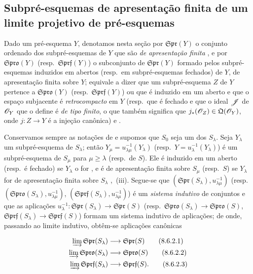 \subsection{Subpré-esquemas de apresentação finita de um limite projetivo de pré-esquemas}
\label{subsection:IV.8.6}

\begin{env}[8.6.1]
\label{IV.8.6.1}
Dado um pré-esquema $Y$, denotamos nesta seção por $\mathfrak{Spr}(Y)$ o conjunto ordenado
 dos subpré-esquemas de $Y$ que são \emph{de apresentação finita}
, e por $\mathfrak{Spro}(Y)$ (resp.\ $\mathfrak{Sprf}(Y)$) o subconjunto de $\mathfrak{Spr}(Y)$ formado pelos subpré-esquemas induzidos em abertos (resp.\ em subpré-esquemas fechados) de $Y$, de apresentação finita sobre $Y$; equivale a dizer que um subpré-esquema $Z$ de $Y$ pertence a $\mathfrak{Spro}(Y)$ (resp.\ $\mathfrak{Sprf}(Y)$) ou que é induzido em um aberto e que o espaço subjacente é \emph{retrocompacto} em $Y$ (resp.\ que é fechado e que o ideal $\mathscr{J}$ de $\mathscr{O}_Y$ que o define é \emph{de tipo finito}, o que também significa que $j_*(\mathscr{O}_Z)\in\mathfrak{Q}(\mathscr{O}_Y)$, onde $j:Z\to Y$ é a injeção canônica)  e .
\end{env}

\begin{env}[8.6.2]
\label{IV.8.6.2}
Conservamos sempre as notações de  e supomos que $S_0$ seja um dos $S_\lambda$.
Seja $Y_\lambda$ um subpré-esquema de $S_\lambda$; então $Y_\mu=u_{\lambda\mu}^{-1}(Y_\lambda)$ (resp.\ $Y=u_\lambda^{-1}(Y_\lambda)$) é um subpré-esquema de $S_\mu$ para $\mu\geqslant\lambda$ (resp.\ de $S$). Ele é induzido em um aberto (resp.\ é fechado) se $Y_\lambda$ o for , e é de apresentação finita sobre $S_\mu$ (resp.\ $S$) se $Y_\lambda$ for de apresentação finita sobre $S_\lambda$ ,~(iii). Segue-se que $(\mathfrak{Spr}(S_\lambda),u_{\lambda\mu}^{-1})$ (resp.\ $(\mathfrak{Spro}(S_\lambda),u_{\lambda\mu}^{-1})$, $(\mathfrak{Sprf}(S_\lambda),u_{\lambda\mu}^{-1})$) é um \emph{sistema indutivo} de conjuntos e que as aplicações $u_\lambda^{-1}:\mathfrak{Spr}(S_\lambda)\to\mathfrak{Spr}(S)$ (resp.\ $\mathfrak{Spro}(S_\lambda)\to\mathfrak{Spro}(S)$, $\mathfrak{Sprf}(S_\lambda)\to\mathfrak{Sprf}(S)$) formam um sistema indutivo de aplicações; de onde, passando ao limite indutivo, obtêm-se aplicações canônicas
\end{env}

\begin{align}
  \varinjlim \mathfrak{Spr}(S_\lambda) &\to \mathfrak{Spr}(S) \tag{8.6.2.1}\label{IV.8.6.2.1}\\
  \varinjlim \mathfrak{Spro}(S_\lambda) &\to \mathfrak{Spro}(S) \tag{8.6.2.2}\label{IV.8.6.2.2}\\
  \varinjlim \mathfrak{Sprf}(S_\lambda) &\to \mathfrak{Sprf}(S). \tag{8.6.2.3}\label{IV.8.6.2.3}
\end{align}

